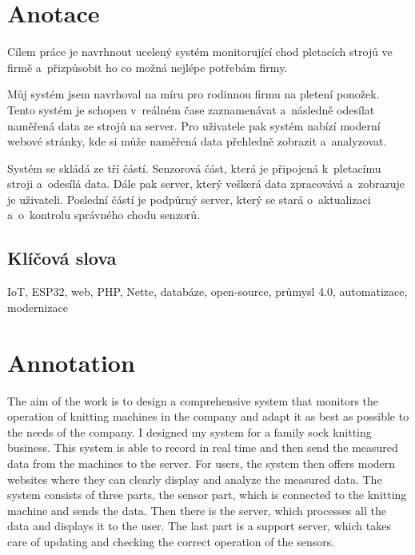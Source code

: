 \documentclass{template/socthesis}
\author{Jakub Andrýsek} %
\begin{document}

\maketitle %



\pagestyle{empty}

\section*{Anotace}
Cílem práce je navrhnout ucelený systém monitorující chod pletacích strojů ve firmě a~přizpůsobit ho co možná nejlépe potřebám firmy.

Můj systém jsem navrhoval na míru pro rodinnou firmu na pletení ponožek. 
Tento systém je schopen v~reálném čase zaznamenávat a~následně odesílat naměřená data ze strojů na server. 
Pro uživatele pak systém nabízí moderní webové stránky, kde si může naměřená data přehledně zobrazit a~analyzovat.

Systém se skládá ze tří částí. Senzorová část, která je připojená k~pletacímu stroji a~odesílá data.
Dále pak server, který veškerá data zpracovává a~zobrazuje je uživateli.
Poslední částí je podpůrný server, který se stará o~aktualizaci a~o~kontrolu správného chodu senzorů.

\subsection*{Klíčová slova}


IoT, ESP32, web, PHP, Nette, databáze, open-source, průmysl 4.0, automatizace, modernizace


\newpage %

\vspace{20mm}

\section*{Annotation}
The aim of the work is to design a comprehensive system that monitors the operation of knitting machines in the company and adapt it as best as possible to the needs of the company.
I designed my system for a family sock knitting business.
This system is able to record in real time and then send the measured data from the machines to the server. 
For users, the system then offers modern websites where they can clearly display and analyze the measured data.
The system consists of three parts, the sensor part, which is connected to the knitting machine and sends the data. 
Then there is the server, which processes all the data and displays it to the user. 
The last part is a support server, which takes care of updating and checking the correct operation of the sensors. 
\end{document}
